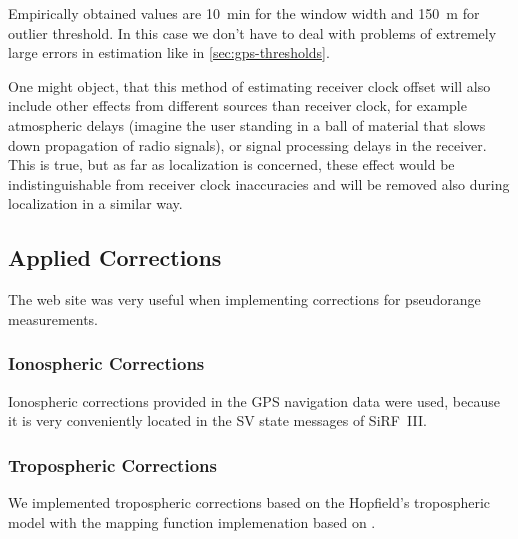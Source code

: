 Empirically obtained values are \SI{10}{\minute} for the window width and
\SI{150}{\meter} for outlier threshold.
In this case we don't have to deal with problems of extremely large errors in estimation
like in \cref{sec:gps-thresholds}.

One might object, that this method of estimating receiver clock offset will
also include other effects from different sources than receiver clock,
for example atmospheric delays (imagine the user standing in a ball of material
that slows down propagation of radio signals), or signal processing delays
in the receiver.
This is true, but as far as localization is concerned, these effect would
be indistinguishable from receiver clock inaccuracies and will be
removed also during localization in a similar way.

\subsection{Applied Corrections}
\label{sec:impl-corrections}
The web site \cite{sam-www} was very useful when implementing corrections for
pseudorange measurements.

\subsubsection{Ionospheric Corrections}
Ionospheric corrections provided in the GPS navigation data were used, because
it is very conveniently located in the SV state messages of SiRF~III.

\subsubsection{Tropospheric Corrections}
We implemented tropospheric corrections based on the Hopfield's tropospheric model
with the mapping function implemenation based on \cite{sam-www}.


